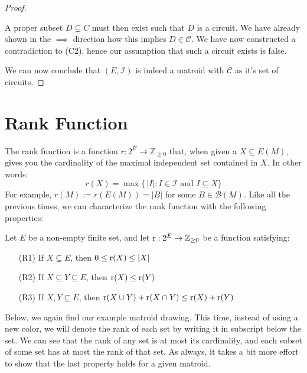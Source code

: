 \begin{proof}
\begin{enumerate}
  A proper subset $D  \subsetneq C$ must then exist such that $D$ is a circuit. We have already shown in the $\implies$ direction how this implies $D \in \mathcal{C}$. We have now constructed a contradiction to (C2), hence our assumption that such a circuit exists is false.

\end{enumerate}



  We can now conclude that $(E, \mathcal I)$ is indeed a matroid with $\mathcal C$ as it's set of circuits.
\end{proof}




\newpage
\section{Rank Function}

The rank function is a function $r:2^E \rightarrow \mathbb{Z}_{\geq0}$ that, when given a $X\subseteq E(M)$, gives you the cardinality of the maximal independent set contained in $X$. In other words:
$$ r(X) = \max\{\, |I| : I\in\mathcal{I} \text{ and } I\subseteq X \} $$
For example, $r(M):=r(E(M))=|B|$ for some $B\in\mathcal{B}(M)$. Like all the previous times, we can characterize the rank function with the following properties:

\begin{defn}
    Let $E$ be a non-empty finite set, and let $\operatorname{r} : 2^E \rightarrow \mathbb{Z}_{\geq0}$ be a function satisfying:
    \begin{enumerate}
        \item[(R1)] If $X\subseteq E$, then $0 \leq \operatorname{r}(X) \leq |X| $
        \item[(R2)] If $X\subseteq Y\subseteq E$, then $\operatorname{r}(X)\leq\operatorname{r}(Y)$
        \item[(R3)] If $X,Y\subseteq E$, then $\operatorname{r}(X\cup Y)+\operatorname{r}(X\cap Y) \leq \operatorname{r}(X)+\operatorname{r}(Y) $
    \end{enumerate}
\end{defn}

Below, we again find our example matroid drawing. This time, instead of using a new color, we will denote the rank of each set by writing it in subscript below the set. We can see that the rank of any set is at most its cardinality, and each subset of some set has at most the rank of that set. As always, it takes a bit more effort to show that the last property holds for a given matroid.

